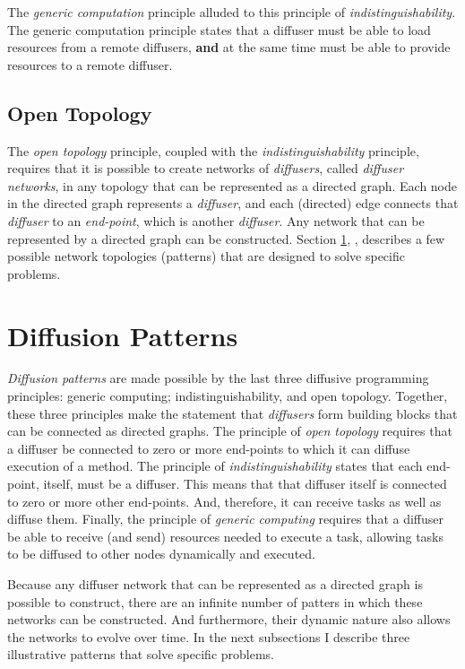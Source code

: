 \documentclass[11pt]{article}
\begin{document}
The \emph{generic computation} principle alluded to this principle of \emph{indistinguishability}. The generic computation principle states that a diffuser must be able to load resources from a remote diffusers, \textbf{and} at the same time must be able to provide resources to a remote diffuser.

\subsection{Open Topology}
The \emph{open topology} principle, coupled with the \emph{indistinguishability} principle, requires that it is possible to create networks of \emph{diffusers}, called \emph{diffuser networks}, in any topology that can be represented as a directed graph. Each node in the directed graph represents a \emph{diffuser}, and each (directed) edge connects that \emph{diffuser} to an \emph{end-point}, which is another \emph{diffuser}. Any network that can be represented by a directed graph can be constructed. Section \ref{sec:diffusion_patterns}, , describes a few possible network topologies (patterns) that are designed to solve specific problems.

%
%
\section{Diffusion Patterns}\label{sec:diffusion_patterns}
\emph{Diffusion patterns} are made possible by the last three diffusive programming principles: generic computing; indistinguishability, and open topology. Together, these three principles make the statement that \emph{diffusers} form building blocks that can be connected as directed graphs. The principle of \emph{open topology} requires that a diffuser be connected to zero or more end-points to which it can diffuse execution of a method. The principle of \emph{indistinguishability} states that each end-point, itself, must be a diffuser. This means that that diffuser itself is connected to zero or more other end-points. And, therefore, it can receive tasks as well as diffuse them. Finally, the principle of \emph{generic computing} requires that a diffuser be able to receive (and send) resources needed to execute a task, allowing tasks to be diffused to other nodes dynamically and executed.

Because any diffuser network that can be represented as a directed graph is possible to construct, there are an infinite number of patters in which these networks can be constructed. And furthermore, their dynamic nature also allows the networks to evolve over time. In the next subsections I describe three illustrative patterns that solve specific problems.
\end{document}
